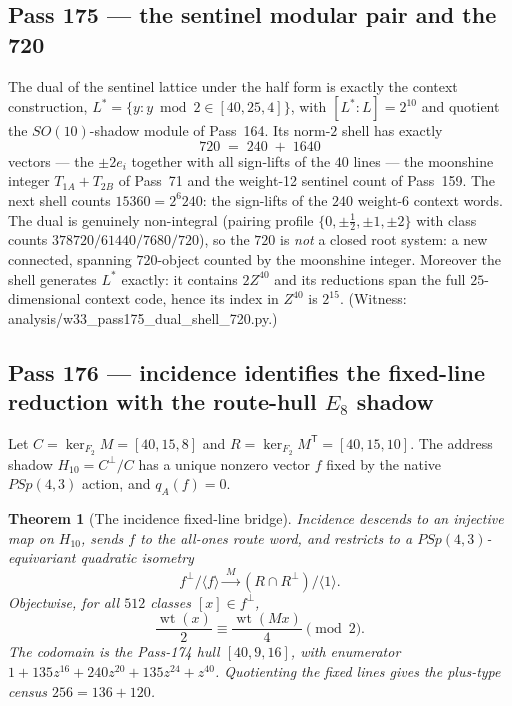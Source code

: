 \documentclass[12pt,a4paper]{article}
\def\mathbb#1{#1}%
\def\mathrm#1{#1}%
\def\mathbf#1{#1}%
\def\texttt#1{#1}%
\def\cdot{ }%
\newtheorem{theorem}{Theorem}[section]
\theoremstyle{definition}
\newcommand{\PSp}{\mathrm{PSp}}
\begin{document}
\subsection{Pass 175 --- the sentinel modular pair and the 720}
\label{ssec:pass175}

The dual of the sentinel lattice under the half form is exactly the
context construction, $L^{*}=\{y:y\bmod2\in[40,25,4]\}$, with
$[L^{*}:L]=2^{10}$ and quotient the $\mathrm{SO}(10)$-shadow module of
Pass~164. Its norm-$2$ shell has exactly
\[
  \boxed{\,720 \;=\; 2\cdot40 \;+\; 16\cdot40\,}
\]
vectors --- the $\pm2e_i$ together with all sign-lifts of the $40$ lines
--- the moonshine integer $T_{1A}+T_{2B}$ of Pass~71 and the weight-12
sentinel count of Pass~159. The next shell counts $15360=2^6\cdot240$: the
sign-lifts of the $240$ weight-6 context words. The dual is genuinely
non-integral (pairing profile $\{0,\pm\tfrac12,\pm1,\pm2\}$ with class
counts $378720/61440/7680/720$), so the $720$ is \emph{not} a closed root
system: a new connected, spanning $720$-object counted by the moonshine
integer.  Moreover the shell generates $L^*$ exactly: it contains
$2\mathbb Z^{40}$ and its reductions span the full $25$-dimensional
context code, hence its index in $\mathbb Z^{40}$ is $2^{15}$.
(Witness: \texttt{analysis/w33\_pass175\_dual\_shell\_720.py}.)

\subsection{Pass 176 --- incidence identifies the fixed-line reduction
with the route-hull $E_8$ shadow}
\label{ssec:pass176}

Let $C=\ker_{\mathbb F_2}M=[40,15,8]$ and
$R=\ker_{\mathbb F_2}M^{\mathsf T}=[40,15,10]$.  The address shadow
$H_{10}=C^\perp/C$ has a unique nonzero vector $f$ fixed by the native
$\PSp(4,3)$ action, and $q_A(f)=0$.

\begin{theorem}[The incidence fixed-line bridge]
\label{thm:pass176-incidence-bridge}
Incidence descends to an injective map on $H_{10}$, sends $f$ to the
all-ones route word, and restricts to a $\PSp(4,3)$-equivariant quadratic
isometry
\[
 \boxed{
 f^\perp/\langle f\rangle
 \xrightarrow{\;M\;}
 (R\cap R^\perp)/\langle\mathbf1\rangle .}
\]
Objectwise, for all $512$ classes $[x]\in f^\perp$,
\[
 \frac{\operatorname{wt}(x)}2
 \equiv
 \frac{\operatorname{wt}(Mx)}4\pmod2.
\]
The codomain is the Pass-174 hull $[40,9,16]$, with enumerator
$1+135z^{16}+240z^{20}+135z^{24}+z^{40}$.  Quotienting the fixed lines
gives the plus-type census $256=136+120$.
\end{theorem}
\end{document}
